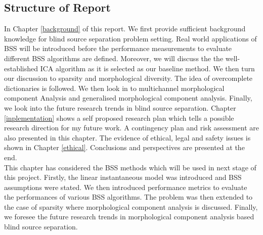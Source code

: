 \subsection{Structure of Report}
In Chapter \ref{background} of this report. We first provide sufficient background knowledge for blind source separation problem setting. 
Real world applications of BSS will be introduced before the performance measurements to evaluate different BSS algorithms are defined. 
Moreover, we will discuss the the well-established ICA algorithm as it is selected as our baseline method.
We then turn our discussion to sparsity and morphological diversity. The idea of overcomplete dictionaries is followed. 
We then look in to multichannel morphological component Analysis and generalised morphological component analysis.
Finally, we look into the future research trends in blind source separation.
Chapter \ref{inplementation} shows a self proposed research plan which tells a possible research direction for my future work. A contingency plan and risk assessment are also presented in this chapter.
The evidence of ethical, legal and safety issues is shown in Chapter \ref{ethical}. Conclusions and perspectives are presented at the end.\\

This chapter has considered the BSS methods which will be used in next stage of this project. Firstly, the linear instantaneous model was introduced and BSS assumptions were stated. We then introduced performance metrics to evaluate the performances of various BSS algorithms. The problem was then extended to the case of sparsity where morphological component analysis is discussed. Finally, we foresee the future research trends in morphological component analysis based blind source separation. 
